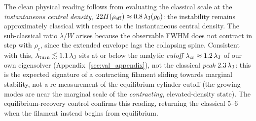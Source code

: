 \documentclass[usenatbib,twoside,twocolumn]{mnras}
\begin{document}
The clean physical reading follows from evaluating the classical scale at the \emph{instantaneous central density}, $22H(\rho_{\rm eff})\approx0.8\,\lambda_{\rm J}(\rho_0)$: the instability remains approximately classical with respect to the instantaneous central density. The sub-classical ratio $\lambda/W$ arises because the observable FWHM does not contract in step with $\rho_c$, since the extended envelope lags the collapsing spine. Consistent with this, $\lambda_{\rm turn}\lesssim1.1\,\lambda_{\rm J}$ sits at or below the analytic \emph{cutoff} $\lambda_{\rm cr}\approx1.2\,\lambda_{\rm J}$ of our own eigensolver (Appendix~\ref{sec:val_appendix}), not the classical \emph{peak} $2.3\,\lambda_{\rm J}$: this is the expected signature of a contracting filament sliding towards marginal stability, not a re-measurement of the equilibrium-cylinder cutoff (the growing modes are near the marginal scale of the \emph{contracting}, elevated-density state). The equilibrium-recovery control confirms this reading, returning the classical $5$--$6$ when the filament instead begins from equilibrium.
\end{document}

